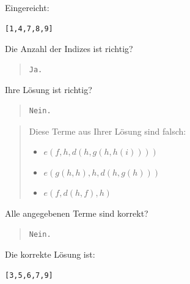 Eingereicht:


\begin{verbatim}
[1,4,7,8,9]
\end{verbatim}


Die Anzahl der Indizes ist richtig?

\begin{quote}
\begin{verbatim}
Ja.
\end{verbatim}
\end{quote}

Ihre Lösung ist richtig?

\begin{quote}
\begin{verbatim}
Nein.
\end{verbatim}
\end{quote}

\begin{quote}Diese Terme aus Ihrer Lösung sind falsch: \begin{itemize}\item{}$\mathit{e(f,h,d(h,g(h,h(i))))}$\item{}$\mathit{e(g(h,h),h,d(h,g(h)))}$\item{}$\mathit{e(f,d(h,f),h)}$\end{itemize}\end{quote}  

Alle angegebenen Terme sind korrekt?

\begin{quote}
\begin{verbatim}
Nein.
\end{verbatim}
\end{quote}

Die korrekte Lösung ist:
\begin{verbatim}
[3,5,6,7,9]
\end{verbatim}


